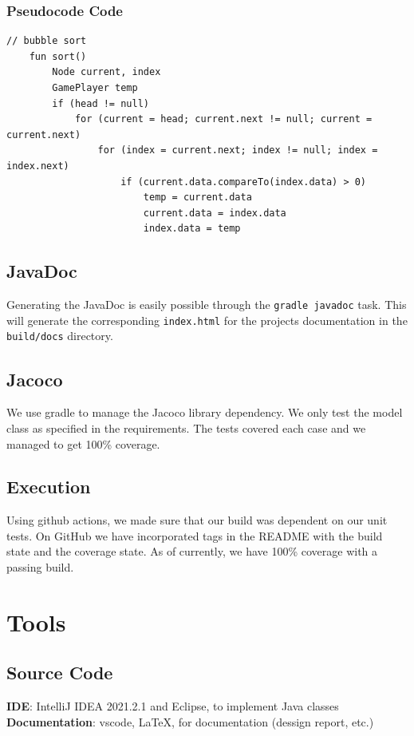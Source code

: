 \documentclass[12pt, dvipsnames, a4paper]{article}
\newcommand{\code}[1]{\texttt{#1}}
\begin{document}
\subsubsection{Pseudocode Code}
\begin{lstlisting}[frame=single, basicstyle=\small]
	// bubble sort
    fun sort() 
        Node current, index
        GamePlayer temp
        if (head != null) 
            for (current = head; current.next != null; current = current.next) 
                for (index = current.next; index != null; index = index.next) 
                    if (current.data.compareTo(index.data) > 0) 
                        temp = current.data
                        current.data = index.data
                        index.data = temp
\end{lstlisting}
\subsection{JavaDoc}
Generating the JavaDoc is easily possible through the \code{gradle javadoc} task. This will generate the
corresponding \code{index.html} for the projects documentation in the \code{build/docs} directory.
\subsection{Jacoco}
We use gradle to manage the Jacoco library dependency. We only test the model class as specified
in the requirements. The tests covered each case and we managed to get 100\% coverage.

\subsection{Execution}
Using github actions, we made sure that our build was dependent on our unit tests. On GitHub we have
incorporated tags in the README with the build state and the coverage state. As of currently, we have
100\% coverage with a passing build.

\section{Tools}
\subsection{Source Code}
\textbf{IDE}: IntelliJ IDEA 2021.2.1 and Eclipse, to implement Java classes\\
\textbf{Documentation}: vscode, \LaTeX, for documentation (dessign report, etc.)
\end{document}
